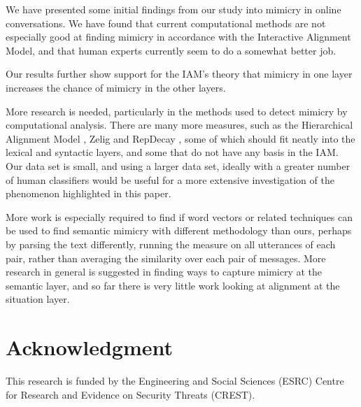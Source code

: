 \documentclass[conference]{IEEEtran}
\begin{document}
We have presented some initial findings from our study into mimicry in online conversations. We have found that current computational methods are not especially good at finding mimicry in accordance with the Interactive Alignment Model, and that human experts currently seem to do a somewhat better job.

Our results further show support for the IAM's theory that mimicry in one layer increases the chance of mimicry in the other layers.

More research is needed, particularly in the methods used to detect mimicry by computational analysis. There are many more measures, such as the Hierarchical Alignment Model \cite{doyle2016robust}, Zelig \cite{jones2014finding} and RepDecay \cite{reitter2006computational}, some of which should fit neatly into the lexical and syntactic layers, and some that do not have any basis in the IAM. Our data set is small, and using a larger data set, ideally with a greater number of human classifiers would be useful for a more extensive investigation of the phenomenon highlighted in this paper.

More work is especially required to find if word vectors or related techniques can be used to find semantic mimicry with different methodology than ours, perhaps by parsing the text differently, running the measure on all utterances of each pair, rather than averaging the similarity over each pair of messages. More research in general is suggested in finding ways to capture mimicry at the semantic layer, and so far there is very little work looking at alignment at the situation layer.


\section*{Acknowledgment}
This research is funded by the Engineering and Social Sciences (ESRC) Centre for Research and Evidence on Security Threats (CREST).



\printbibliography
\end{document}
